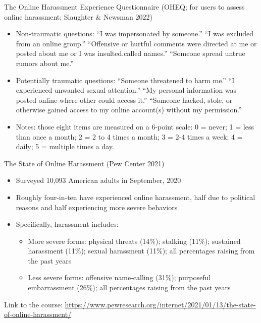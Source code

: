 \documentclass[nobackground,dvipsnames,table]{beamer}
\begin{document}
\begin{frame}{The Online Harassment Experience  Questionnaire 
\footnotesize{(OHEQ; for users to assess online harassment; Slaughter \& Newsman 2022)}}

\begin{itemize}
    \item Non-traumatic questions:  “I was impersonated by someone.”  “I was excluded from an online group.” “Offensive or hurtful comments were directed at me or posted about me or I was insulted.called names.” “Someone spread untrue rumors about me.”
    \item Potentially traumatic questions: “Someone threatened to harm me.” “I experienced unwanted sexual attention.” “My personal information was posted online where other could access it.” “Someone hacked, stole, or otherwise gained access to my online account(s) without my permission.” 
    \item Notes: those eight items are measured on a 6-point scale: 0 = never; 1 = less than once a month; 2 = 2 to 4 times a month; 3 = 2-4 times a week; 4 = daily; 5 = multiple times a day.
\end{itemize}

\end{frame}


\begin{frame}{The State of Online Harassment 
(Pew Center 2021)}

\begin{itemize}
    \item Surveyed 10,093 American adults in September,  2020
    \item Roughly four-in-ten have experienced online harassment, half due to political reasons and half experiencing more severe behaviors
    \item Specifically, harassment includes:
    \begin{itemize}
        \item More severe forms: physical threats (14\%); stalking (11\%); sustained harassment (11\%); sexual harassment (11\%); all percentages raising from the past years
        \item Less severe forms: offensive name-calling (31\%); purposeful embarrassment (26\%); all percentages raising from the past years
    \end{itemize}
\end{itemize}

\scriptsize{Link to the course: \url{https://www.pewresearch.org/internet/2021/01/13/the-state-of-online-harassment/}}
\end{frame}
\end{document}
